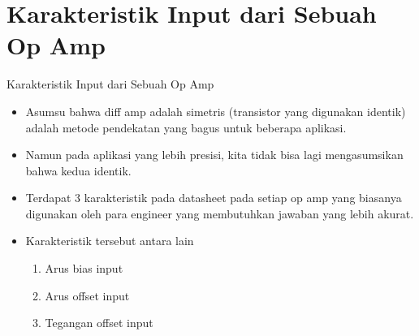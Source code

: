 \documentclass[aspectratio=169]{beamer}
\begin{document}
\section{Karakteristik Input dari Sebuah Op Amp}
\begin{frame}{Karakteristik Input dari Sebuah Op Amp}
	\begin{itemize}
		\item Asumsu bahwa diff amp adalah simetris (transistor yang digunakan identik) adalah metode pendekatan yang bagus untuk beberapa aplikasi.
		\item Namun pada aplikasi yang lebih presisi, kita tidak bisa lagi mengasumsikan bahwa kedua identik.
		\item Terdapat 3 karakteristik pada datasheet pada setiap op amp yang biasanya digunakan oleh para engineer yang membutuhkan jawaban yang lebih akurat.
		\item Karakteristik tersebut antara lain
		\begin{enumerate}
			\item Arus bias input
			\item Arus offset input
			\item Tegangan offset input
		\end{enumerate}
	\end{itemize}
\end{frame}
\end{document}
